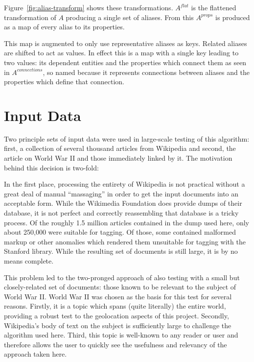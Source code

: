 Figure~\ref{fig:alias-transform} shows these transformations.  $A^{flat}$ is the flattened transformation of $A$ producing a single set of aliases.  From this $A^{props}$ is produced as a map of every alias to its properties. 

This map is augmented to only use representative aliases as keys.  Related aliases are shifted to act as values.  In effect this is a map with a single key leading to two values: its dependent entities and the properties which connect them as seen in $A^{connections}$, so named because it represents connections between aliases and the properties which define that connection.


\chapter{Input Data}

Two principle sets of input data were used in large-scale testing of this algorithm: first, a collection of several thousand articles from Wikipedia and second, the article on World War II and those immediately linked by it.  The motivation behind this decision is two-fold:

In the first place, processing the entirety of Wikipedia is not practical without a great deal of manual ``massaging'' in order to get the input documents into an acceptable form.  While the Wikimedia Foundation does provide dumps of their database, it is not perfect and correctly reassembling that database is a tricky process.  Of the roughly 1.5 million articles contained in the dump used here, only about 250,000 were suitable for tagging.  Of those, some contained malformed markup or other anomalies which rendered them unsuitable for tagging with the Stanford library.  While the resulting set of documents is still large, it is by no means complete.

This problem led to the two-pronged approach of also testing with a small but closely-related set of documents: those known to be relevant to the subject of World War II.  World War II was chosen as the basis for this test for several reasons.  Firstly, it is a topic which spans (quite literally) the entire world, providing a robust test to the geolocation aspects of this project.  Secondly, Wikipedia's body of text on the subject is sufficiently large to challenge the algorithm used here.  Third, this topic is well-known to any reader or user and therefore allows the user to quickly see the usefulness and relevancy of the approach taken here.

